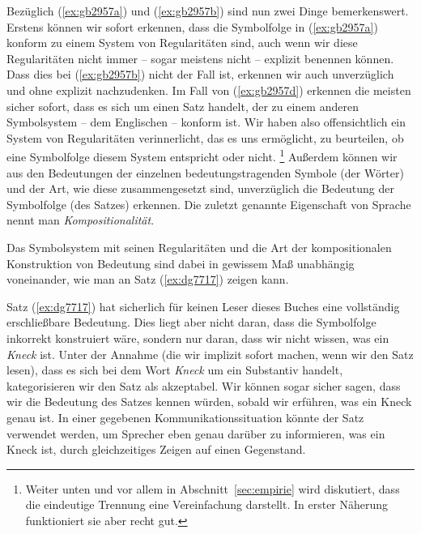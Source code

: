 \begin{exe}
  \ex
  \begin{xlist}
  \end{xlist}
\end{exe}


Bezüglich (\ref{ex:gb2957a}) und (\ref{ex:gb2957b}) sind nun zwei Dinge bemerkenswert.
Erstens können wir sofort erkennen, dass die Symbolfolge in (\ref{ex:gb2957a}) konform zu einem System von Regularitäten sind, auch wenn wir diese Regularitäten nicht immer -- sogar meistens nicht -- explizit benennen können.
Dass dies bei (\ref{ex:gb2957b}) nicht der Fall ist, erkennen wir auch unverzüglich und ohne explizit nachzudenken.
Im Fall von (\ref{ex:gb2957d}) erkennen die meisten sicher sofort, dass es sich um einen Satz handelt, der zu einem anderen Symbolsystem -- dem Englischen -- konform ist.
Wir haben also offensichtlich ein System von Regularitäten verinnerlicht, das es uns ermöglicht, zu beurteilen, ob eine Symbolfolge diesem System entspricht oder nicht.%
\footnote{Weiter unten und vor allem in Abschnitt~\ref{sec:empirie} wird diskutiert, dass die eindeutige Trennung eine Vereinfachung darstellt.
In erster Näherung funktioniert sie aber recht gut.}
Außerdem können wir aus den Bedeutungen der einzelnen bedeutungstragenden Symbole (der Wörter) und der Art, wie diese zusammengesetzt sind, unverzüglich die Bedeutung der Symbolfolge (des Satzes) erkennen.
Die zuletzt genannte Eigenschaft von Sprache nennt man \textit{Kompositionalität}.


Das Symbolsystem mit seinen Regularitäten und die Art der kompositionalen Konstruktion von Bedeutung sind dabei in gewissem Maß unabhängig voneinander, wie man an Satz (\ref{ex:dg7717}) zeigen kann.

\begin{exe}
\end{exe}

Satz (\ref{ex:dg7717}) hat sicherlich für keinen Leser dieses Buches eine vollständig er\-schließ\-bare Bedeutung.
Dies liegt aber nicht daran, dass die Symbolfolge inkorrekt konstruiert wäre, sondern nur daran, dass wir nicht wissen, was ein \textit{Kneck} ist.
Unter der Annahme (die wir implizit sofort machen, wenn wir den Satz lesen), dass es sich bei dem Wort \textit{Kneck} um ein Substantiv handelt, kategorisieren wir den Satz als akzeptabel.
Wir können sogar sicher sagen, dass wir die Bedeutung des Satzes kennen würden, sobald wir erführen, was ein Kneck genau ist.
In einer gegebenen Kommunikationssituation könnte der Satz verwendet werden, um Sprecher eben genau darüber zu informieren, was ein Kneck ist, \zB durch gleichzeitiges Zeigen auf einen Gegenstand.

